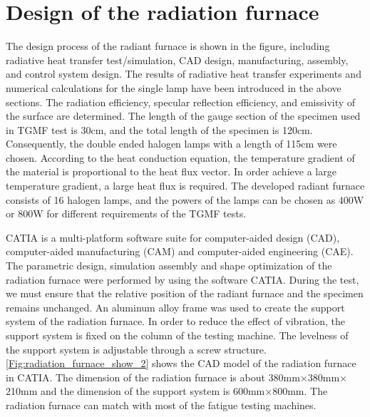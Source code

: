 \section{Design of the radiation furnace}
\noindent
The design process of the radiant furnace is shown in the figure, including radiative heat transfer test/simulation, CAD design, manufacturing, assembly, and control system design.
The results of radiative heat transfer experiments and numerical calculations for the single lamp have been introduced in the above sections.
The radiation efficiency, specular reflection efficiency, and emissivity of the surface are determined.
The length of the gauge section of the specimen used in TGMF test is 30cm, and the total length of the specimen is 120cm. Consequently, the double ended halogen lamps with a length of 115cm were chosen. According to the heat conduction equation, the temperature gradient of the material is proportional to the heat flux vector. In order achieve a large temperature gradient, a large heat flux is required. The developed radiant furnace consists of 16 halogen lamps, and the powers of the lamps can be chosen as 400W or 800W for different requirements of the TGMF tests.

CATIA is a multi-platform software suite for computer-aided design (CAD), computer-aided manufacturing (CAM) and computer-aided engineering (CAE).
The parametric design, simulation assembly and shape optimization of the radiation furnace were performed by using the software CATIA.
During the test, we must ensure that the relative position of the radiant furnace and the specimen remains unchanged. An aluminum alloy frame was used to create the support system of the radiation furnace. In order to reduce the effect of vibration, the support system is fixed on the column of the testing machine. The levelness of the support system is adjustable through a screw structure. \ref{Fig:radiation_furnace_show_2} shows the CAD model of the radiation furnace in CATIA. The dimension of the radiation furnace is about 380mm$\times$380mm$\times$210mm and the dimension of the support system is 600mm$\times$800mm. The radiation furnace can match with most of the fatigue testing machines.

